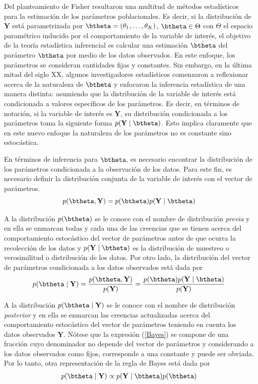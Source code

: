 Del planteamiento de Fisher resultaron una multitud de métodos estadísticos para la estimación de los parámetros poblacionales. Es decir, si la distribución de $\mathbf{Y}$ está parametrizada por $\btheta=(\theta_1,\ldots,\theta_K)$, $\btheta \in \Theta$ con $\Theta$ el espacio paramétrico inducido por el comportamiento de la variable de interés, el objetivo de la teoría estadística inferencial es calcular una estimación $\hat{\btheta}$ del parámetro $\btheta$ por medio de los datos observados. En este enfoque, los parámetros se consideran cantidades fijas y constantes. Sin embargo, en la última mitad del siglo XX, algunos investigadores estadísticos comenzaron a reflexionar acerca de la naturaleza de $\btheta$ y enfocaron la inferencia estadística de una manera distinta: asumiendo que la distribución de la variable de interés está condicionada a valores específicos de los parámetros. Es decir, en términos de notación, si la variable de interés es $\mathbf{Y}$, su distribución condicionada a los parámetros toma la siguiente forma $p(\mathbf{Y} \mid \btheta)$. Esto implica claramente que en este nuevo enfoque la naturaleza de los parámetros no es constante sino estocástica.

En términos de inferencia para $\btheta$, es necesario encontrar la distribución de los parámetros condicionada a la observación de los datos. Para este fin, es necesario definir la distribución conjunta de la variable de interés con el vector de parámetros.
\begin{equation*}
p(\btheta,\mathbf{Y})=p(\btheta)p(\mathbf{Y} \mid \btheta)
\end{equation*}

A la distribución $p(\btheta)$ se le conoce con el nombre de distribución \emph{previa} y en ella se enmarcan todas y cada una de las creencias que se tienen acerca del comportamiento estocástico del vector de parámetros antes de que ocurra la recolección de los datos y $p(\mathbf{Y} \mid \btheta)$ es la distribución de muestreo o verosimilitud o distribución de los datos. Por otro lado, la distribución del vector de parámetros condicionada a los datos observados está dada por
\begin{equation}\label{Bayes}
p(\btheta \mid \mathbf{Y})=\frac{p(\btheta,\mathbf{Y})}{p(\mathbf{Y})}=\frac{p(\btheta)p(\mathbf{Y} \mid \btheta)}{p(\mathbf{Y})}
\end{equation}

A la distribución $p(\btheta \mid \mathbf{Y})$ se le conoce con el nombre de distribución \emph{posterior} y en ella se enmarcan las creencias actualizadas acerca del comportamiento estocástico del vector de parámetros teniendo en cuenta los datos observados $\mathbf{Y}$. Nótese que la expresión (\ref{Bayes}) se compone de una fracción cuyo denominador no depende del vector de parámetros y considerando a los datos observados como fijos, corresponde a una constante y puede ser obviada. Por lo tanto, otra representación de la regla de Bayes está dada por
\begin{align}\label{Bayes1}
p(\btheta \mid \mathbf{Y})\propto p(\mathbf{Y} \mid \btheta)p(\btheta)
\end{align}

